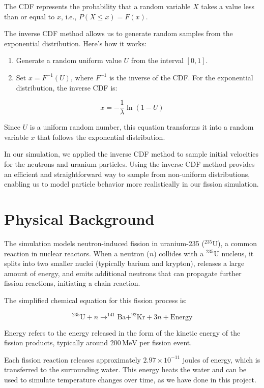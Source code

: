 \documentclass[twocolumn, 11pt]{article}
\begin{document}
The CDF represents the probability that a random variable \(X\) takes a value less than or equal to \(x\), i.e., \( P(X \leq x) = F(x) \).

The inverse CDF method allows us to generate random samples from the exponential distribution. Here’s how it works:
\begin{enumerate}
    \item Generate a random uniform value \( U \) from the interval \( [0, 1] \).
    \item Set \( x = F^{-1}(U) \), where \( F^{-1} \) is the inverse of the CDF. For the exponential distribution, the inverse CDF is:
\end{enumerate}

\[
x = -\frac{1}{\lambda} \ln(1 - U)
\]

Since \( U \) is a uniform random number, this equation transforms it into a random variable \( x \) that follows the exponential distribution.

In our simulation, we applied the inverse CDF method to sample initial velocities for the neutrons and uranium particles. Using the inverse CDF method provides an efficient and straightforward way to sample from non-uniform distributions, enabling us to model particle behavior more realistically in our fission simulation.

\section*{Physical Background}
The simulation models neutron-induced fission in uranium-235 (\(^{235}\text{U}\)), a common reaction in nuclear reactors. When a neutron (\(n\)) collides with a \(^{235}\text{U}\) nucleus, it splits into two smaller nuclei (typically barium and krypton), releases a large amount of energy, and emits additional neutrons that can propagate further fission reactions, initiating a chain reaction.

The simplified chemical equation for this fission process is:

\[
^{235}\text{U} + n \rightarrow ^{141}\text{Ba} + ^{92}\text{Kr} + 3n + \text{Energy}
\]

Energy refers to the energy released in the form of the kinetic energy of the fission products, typically around \(200 \, \text{MeV}\) per fission event.

Each fission reaction releases approximately \(2.97 \times 10^{-11}\) joules of energy, which is transferred to the surrounding water. This energy heats the water and can be used to simulate temperature changes over time, as we have done in this project.
\end{document}
